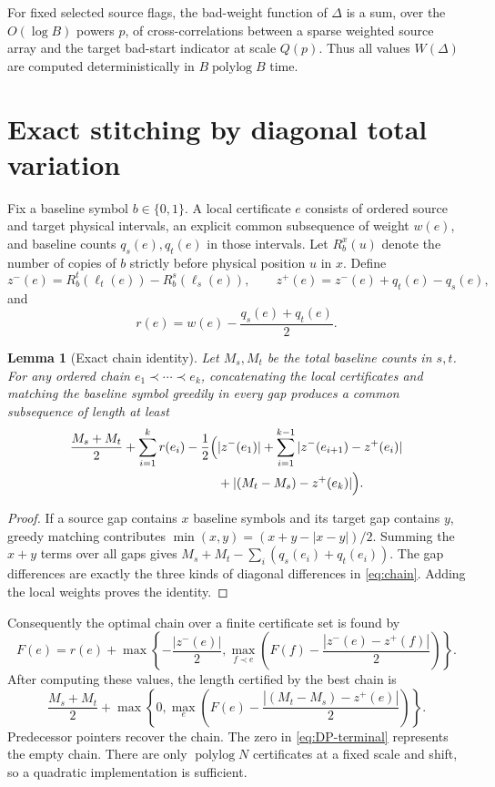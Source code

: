 \documentclass[11pt]{article}
\newtheorem{lemma}[lemma]{Lemma}
\theoremstyle{remark}
\newcommand{\polylog}{\operatorname{polylog}}
\begin{document}
For fixed selected source flags, the bad-weight function of $\Delta$ is a
sum, over the $O(\log B)$ powers $p$, of cross-correlations between a sparse
weighted source array and the target bad-start indicator at scale $Q(p)$.
Thus all values $W(\Delta)$ are computed deterministically in
$B\polylog B$ time.

\section{Exact stitching by diagonal total variation}
\label{sec:stitching}

Fix a baseline symbol $b\in\{0,1\}$.  A local certificate $e$ consists of
ordered source and target physical intervals, an explicit common subsequence
of weight $w(e)$, and baseline counts $q_s(e),q_t(e)$ in those intervals.
Let $R_b^x(u)$ denote the number of copies of $b$ strictly before physical
position $u$ in $x$.  Define
\[
 z^-(e)=R_b^t(\ell_t(e))-R_b^s(\ell_s(e)),
 \qquad
 z^+(e)=z^-(e)+q_t(e)-q_s(e),
\]
and
\[
 r(e)=w(e)-\frac{q_s(e)+q_t(e)}2.
\]

\begin{lemma}[Exact chain identity]\label{lem:chain}
Let $M_s,M_t$ be the total baseline counts in $s,t$.  For any ordered chain
$e_1\prec\cdots\prec e_k$, concatenating the local certificates and matching
the baseline symbol greedily in every gap produces a common subsequence of
length at least
\begin{align}\label{eq:chain}
 \frac{M_s+M_t}{2}+\sum_{i=1}^kr(e_i)
 -\frac12\Bigl(&|z^-(e_1)|
 +\sum_{i=1}^{k-1}|z^-(e_{i+1})-z^+(e_i)|\\
 &+|(M_t-M_s)-z^+(e_k)|\Bigr).
\end{align}
\end{lemma}

\begin{proof}
If a source gap contains $x$ baseline symbols and its target gap contains
$y$, greedy matching contributes
$\min(x,y)=(x+y-|x-y|)/2$.  Summing the $x+y$ terms over all gaps gives
$M_s+M_t-\sum_i(q_s(e_i)+q_t(e_i))$.  The gap differences are exactly the
three kinds of diagonal differences in \eqref{eq:chain}.  Adding the local
weights proves the identity.
\end{proof}

Consequently the optimal chain over a finite certificate set is found by
\begin{equation}\label{eq:DP}
 F(e)=r(e)+\max\left\{-\frac{|z^-(e)|}{2},
 \max_{f\prec e}\left(F(f)-\frac{|z^-(e)-z^+(f)|}{2}\right)\right\}.
\end{equation}
After computing these values, the length certified by the best chain is
\begin{equation}\label{eq:DP-terminal}
 \frac{M_s+M_t}{2}+
 \max\left\{0,\max_e\left(
 F(e)-\frac{|(M_t-M_s)-z^+(e)|}{2}\right)\right\}.
\end{equation}
Predecessor pointers recover the chain.  The zero in
\eqref{eq:DP-terminal} represents the empty chain.
There are only $\polylog N$ certificates at a fixed scale and shift, so a
quadratic implementation is sufficient.
\end{document}
